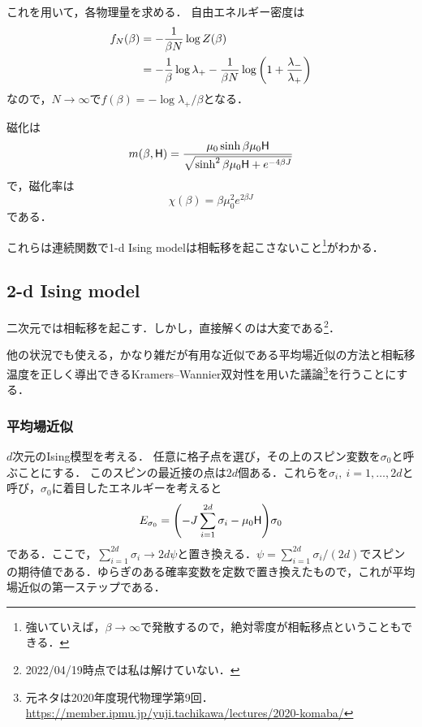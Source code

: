 	これを用いて，各物理量を求める．
	自由エネルギー密度は
	\begin{align}
			f_N(\beta) &= -\frac{1}{\beta N}\log Z(\beta)\\
					   &= -\frac{1}{\beta}\log\lambda_{+} - \frac{1}{\beta N}\log\qty(1 + \frac{\lambda_{-}}{\lambda_{+}})
	\end{align}
	なので，$N\to \infty$で$f(\beta ) = -\log\lambda_{+}/\beta$となる．

	磁化は
	\begin{equation}
			m(\beta, \mathsf{H}) = \frac{\mu_0\sinh\beta\mu_0\mathsf{H}}{\sqrt{\sinh^2\beta\mu_0\mathsf{H} + e^{-4\beta J}}}
	\end{equation}
	で，磁化率は
	\begin{equation}
			\chi(\beta) = \beta \mu_0^2e^{2\beta J}
	\end{equation}
	である．

	これらは連続関数で1-d Ising modelは相転移を起こさないこと\footnote{強いていえば，$\beta\to\infty$で発散するので，絶対零度が相転移点ということもできる． }がわかる．

	\subsection{2-d Ising model}
	二次元では相転移を起こす．しかし，直接解くのは大変である\footnote{2022/04/19時点では私は解けていない．}．

	他の状況でも使える，かなり雑だが有用な近似である平均場近似の方法と相転移温度を正しく導出できるKramers--Wannier双対性を用いた議論\footnote{元ネタは2020年度現代物理学第9回．\url{https://member.ipmu.jp/yuji.tachikawa/lectures/2020-komaba/}}を行うことにする．


	\subsubsection{平均場近似}
	
	$d$次元のIsing模型を考える．
	任意に格子点を選び，その上のスピン変数を$\sigma_0$と呼ぶことにする．
	このスピンの最近接の点は$2d$個ある．これらを$\sigma_i,\ i=1,\ldots,2d$と呼び，$\sigma_0$に着目したエネルギーを考えると
	\begin{equation}
			E_{\sigma_0} = \qty(-J\sum_{i=1}^{2d}\sigma_i -\mu_0\mathsf{H})\sigma_0
	\end{equation}
	である．ここで，$\sum_{i=1}^{2d}\sigma_i \to 2d\psi$と置き換える．$\psi = \sum_{i=1}^{2d}\sigma_i/(2d)$でスピンの期待値である．ゆらぎのある確率変数を定数で置き換えたもので，これが平均場近似の第一ステップである．


